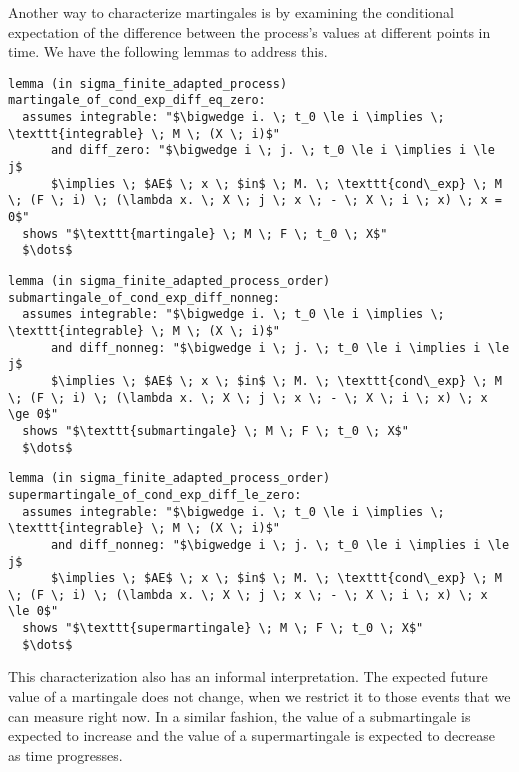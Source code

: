 Another way to characterize martingales is by examining the conditional expectation of the difference between the process's values at different points in time. We have the following lemmas to address this.

\begin{isalemma}
{\small
\begin{lstlisting}[style=isabelle]
lemma (in sigma_finite_adapted_process) martingale_of_cond_exp_diff_eq_zero: 
  assumes integrable: "$\bigwedge i. \; t_0 \le i \implies \; \texttt{integrable} \; M \; (X \; i)$" 
      and diff_zero: "$\bigwedge i \; j. \; t_0 \le i \implies i \le j$
	  $\implies \; $AE$ \; x \; $in$ \; M. \; \texttt{cond\_exp} \; M \; (F \; i) \; (\lambda x. \; X \; j \; x \; - \; X \; i \; x) \; x = 0$"
  shows "$\texttt{martingale} \; M \; F \; t_0 \; X$"
  $\dots$
\end{lstlisting}
}
\end{isalemma}

\begin{isalemma}
{\small
\begin{lstlisting}[style=isabelle]
lemma (in sigma_finite_adapted_process_order) submartingale_of_cond_exp_diff_nonneg:
  assumes integrable: "$\bigwedge i. \; t_0 \le i \implies \; \texttt{integrable} \; M \; (X \; i)$" 
      and diff_nonneg: "$\bigwedge i \; j. \; t_0 \le i \implies i \le j$
	  $\implies \; $AE$ \; x \; $in$ \; M. \; \texttt{cond\_exp} \; M \; (F \; i) \; (\lambda x. \; X \; j \; x \; - \; X \; i \; x) \; x \ge 0$"
  shows "$\texttt{submartingale} \; M \; F \; t_0 \; X$"
  $\dots$
\end{lstlisting}
}
\end{isalemma}

\begin{isalemma}
{\small
\begin{lstlisting}[style=isabelle]
lemma (in sigma_finite_adapted_process_order) supermartingale_of_cond_exp_diff_le_zero: 
  assumes integrable: "$\bigwedge i. \; t_0 \le i \implies \; \texttt{integrable} \; M \; (X \; i)$" 
      and diff_nonneg: "$\bigwedge i \; j. \; t_0 \le i \implies i \le j$
	  $\implies \; $AE$ \; x \; $in$ \; M. \; \texttt{cond\_exp} \; M \; (F \; i) \; (\lambda x. \; X \; j \; x \; - \; X \; i \; x) \; x \le 0$"
  shows "$\texttt{supermartingale} \; M \; F \; t_0 \; X$"
  $\dots$
\end{lstlisting}
}
\end{isalemma}

This characterization also has an informal interpretation. The expected future value of a martingale does not change, when we restrict it to those events that we can measure right now. In a similar fashion, the value of a submartingale is expected to increase and the value of a supermartingale is expected to decrease as time progresses.

